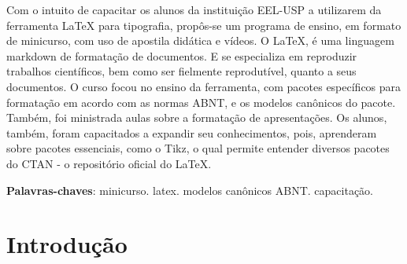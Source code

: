 \documentclass[
12pt,				%
openright,			%
oneside,			%
a4paper,			%
english,			%
french,				%
spanish,			%
brazil,				%
]{abntex2}
\begin{document}

\frenchspacing


\imprimircapa


\setlength{\absparsep}{18pt} %
\begin{resumo}
  Com o intuito de capacitar os alunos da instituição EEL-USP a
  utilizarem da ferramenta \LaTeX{} para tipografia, propôs-se um programa
  de ensino, em formato de minicurso, com uso de apostila didática e vídeos. O
  \LaTeX, é uma linguagem markdown de formatação de documentos. E se especializa em reproduzir trabalhos científicos, bem
  como ser fielmente reprodutível, quanto a seus documentos. O curso focou no
  ensino da ferramenta, com pacotes específicos para formatação em
  acordo com as normas ABNT, e os modelos canônicos do pacote. Também,
  foi ministrada aulas sobre a formatação de apresentações. Os alunos,
  também, foram capacitados a expandir seu conhecimentos, pois,
  aprenderam sobre pacotes essenciais, como o Tikz, o qual permite
  entender diversos pacotes do CTAN - o repositório oficial do \LaTeX.

  \noindent
  \textbf{Palavras-chaves}: minicurso. latex. modelos canônicos ABNT. capacitação.

\end{resumo}


\tableofcontents*


\textual

\chapter[Introdução]{Introdução}
\end{document}
